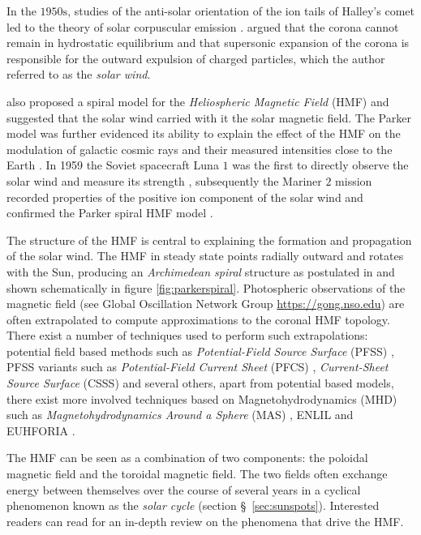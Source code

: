 In the $1950\text{s}$, studies of the anti-solar orientation of the ion tails of Halley's comet 
led to the theory of solar corpuscular emission \citep{Bierman1,Bierman2,Bierman3}. 
\citet{parker1958dynamics,Parker1960,Parker1965} argued that the corona cannot remain in 
hydrostatic equilibrium and that supersonic expansion of the corona is responsible for the 
outward expulsion of charged particles, which the author referred to as the \emph{solar wind}.

\citet{parker1958dynamics} also proposed a spiral model for the \emph{Heliospheric Magnetic Field} (HMF) and 
suggested that the solar wind carried with it the solar magnetic field. The Parker model was further evidenced its 
ability to explain the effect of the HMF on the modulation of galactic cosmic rays and their measured intensities 
close to the Earth \citep{ParkerSolarWind}. In 1959 the Soviet spacecraft Luna $1$ was the first to directly observe 
the solar wind and measure its strength \citep{harvey2007russian}, subsequently the Mariner $2$ mission recorded 
properties of the positive ion component of the solar wind and confirmed the Parker spiral HMF model \citep{neugebauer1966mariner}.

The structure of the HMF is central to explaining the formation and propagation of the solar wind. The HMF in steady 
state points radially outward and rotates with the Sun, producing an \emph{Archimedean spiral} 
structure as postulated in \cite{parker1958dynamics} and shown schematically in figure \ref{fig:parkerspiral}. 
Photospheric observations of the magnetic field (see Global Oscillation Network Group \url{https://gong.nso.edu}) 
are often extrapolated to compute approximations to the coronal HMF topology. There exist a number of techniques used 
to perform such extrapolations: potential field based methods such as \emph{Potential-Field Source Surface} (PFSS) 
\citep{schatten1969model,altschuler1969magnetic}, PFSS variants such as \emph{Potential-Field Current Sheet} (PFCS) 
\citep{schatten1971current}, \emph{Current-Sheet Source Surface} (CSSS) \citep{csss} and several others, apart from potential based 
models, there exist more involved techniques based on Magnetohydrodynamics (MHD) such as 
\emph{Magnetohydrodynamics Around a Sphere} (MAS) \citep{linker1999magnetohydrodynamic}, 
ENLIL \citep{ODSTRCIL1996,ODSTRCIL1999a,ODSTRCIL1999b,ODSTRCIL2003,ODSTRCIL2004} and EUHFORIA \citep{pomoell2018euhforia}. 

The HMF can be seen as a combination of two components: the poloidal magnetic field and the toroidal magnetic field.
The two fields often exchange energy between themselves over the course of several years in a cyclical phenomenon
known as the \emph{solar cycle} (section \S~\ref{sec:sunspots}). Interested readers can read \citet{Owens2013} for an 
in-depth review on the phenomena that drive the HMF.

